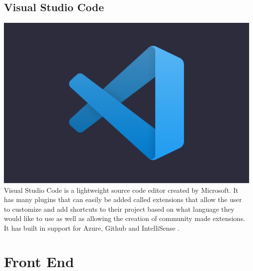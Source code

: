 \subsection{Visual Studio Code}
\includegraphics[scale=0.025]{./img/VsCode.PNG}
Visual Studio Code is a lightweight source code editor created by Microsoft. It has many plugins that can easily be added called extensions that allow the user to customize and add shortcuts to their project based on what language they would like to use as well as allowing the creation of community made extensions. It has built in support for Azure, Github and IntelliSense \cite{vscode}.

\section{Front End}
